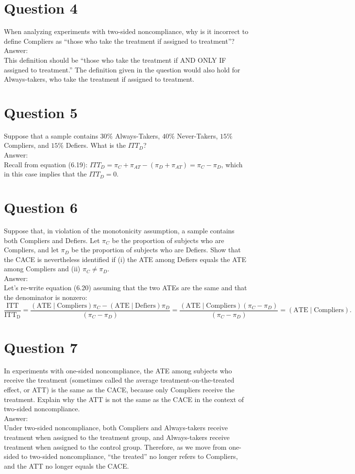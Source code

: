 \documentclass[11pt,notitlepage]{article}\usepackage[]{graphicx}\usepackage[]{color}
\begin{document}
\section*{Question 4}
When analyzing experiments with two-sided noncompliance, why is it incorrect to define Compliers as ``those who take the treatment if assigned to treatment''? \\
Answer:\\
This definition should be ``those who take the treatment if AND ONLY IF assigned to treatment.''  The definition given in the question would also hold for Always-takers, who take the treatment if assigned to treatment.

\section*{Question 5}
Suppose that a sample contains $30\%$ Always-Takers, $40\%$ Never-Takers, $15\%$ Compliers, and $15\%$ Defiers. What is the $ITT_D$? \\
Answer:\\
Recall from equation (6.19): $ITT_D= \pi_C+ \pi_{AT}- (\pi_D + \pi_{AT}) = \pi_C- \pi_D$, which in this case implies that the $ITT_D = 0$.

\section*{Question 6}
Suppose that, in violation of the monotonicity assumption, a sample contains both Compliers and Defiers. Let $\pi_C$ be the proportion of subjects who are Compliers, and let $\pi_D$ be the proportion of subjects who are Defiers. Show that the CACE is nevertheless identified if (i) the ATE among Defiers equals the ATE among Compliers and (ii) $\pi_C \neq \pi_D$.\\
Answer:\\
Let's re-write equation (6.20) assuming that the two ATEs are the same and that the denominator is nonzero:
\begin{equation*}
\frac{\mathrm{ITT}}{\mathrm{ITT_D}} =\frac{\mathrm{(ATE\mid Compliers)} \pi_C-\mathrm{(ATE\mid Defiers)}\pi_D}{(\pi_C-\pi_D )}=\frac{\mathrm{(ATE\mid Compliers)} (\pi_C- \pi_D)}{(\pi_C-\pi_D)}=\mathrm{(ATE\mid Compliers)}.
\end{equation*}

\section*{Question 7}
In experiments with one-sided noncompliance, the ATE among subjects who receive the treatment (sometimes called the average treatment-on-the-treated effect, or ATT) is the same as the CACE, because only Compliers receive the treatment. Explain why the ATT is not the same as the CACE in the context of two-sided noncompliance.\\
Answer:\\
Under two-sided noncompliance, both Compliers and Always-takers receive treatment when assigned to the treatment group, and Always-takers receive treatment when assigned to the control group. Therefore, as we move from one-sided to two-sided noncompliance, ``the treated'' no longer refers to Compliers, and the ATT no longer equals the CACE.
\end{document}
